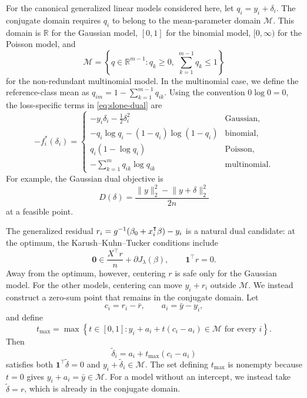 \documentclass[a4paper,fleqn]{cas-sc}
\begin{document}
For the canonical generalized linear models considered here, let
\(q_i = y_i + \delta_i\). The conjugate domain requires \(q_i\) to belong to the
mean-parameter domain \(\mathcal{M}\). This domain is \(\mathbb{R}\) for the
Gaussian model, \([0,1]\) for the binomial model, \([0,\infty)\) for the Poisson
model, and
\[
  \mathcal{M} = \left\{ q \in \mathbb{R}^{m-1}: q_k \geq 0,\; \sum_{k=1}^{m-1}q_k \leq 1 \right\}
\]
for the non-redundant multinomial model. In the multinomial case, we define the
reference-class mean as \(q_{im} = 1 - \sum_{k=1}^{m-1}q_{ik}\). Using the
convention \(0\log 0 = 0\), the loss-specific terms in \autoref{eq:slope-dual}
are
\[
  -f_i^*(\delta_i)
  = \begin{cases}
      -y_i\delta_i - \frac{1}{2}\delta_i^2         & \text{Gaussian},    \\
      -q_i\log q_i - (1 - q_i)\log(1 - q_i)        & \text{binomial},    \\
      q_i(1 - \log q_i)                            & \text{Poisson},     \\
      -\displaystyle\sum_{k=1}^m q_{ik}\log q_{ik} & \text{multinomial}.
    \end{cases}
\]
For example, the Gaussian dual objective is
\[
  D(\delta) = \frac{\lVert y\rVert_2^2 - \lVert y + \delta\rVert_2^2}{2n}
\]
at a feasible point.

The generalized residual \(r_i = g^{-1}(\beta_0 + x_i^\intercal\beta) - y_i\) is
a natural dual candidate: at the optimum, the Karush--Kuhn--Tucker conditions
include
\[
  \bm{0} \in \frac{X^\intercal r}{n}
             + \partial J_\lambda(\beta), \qquad \bm{1}^\intercal r
         =   0.
\]
Away from the optimum, however, centering \(r\) is safe only for the Gaussian
model. For the other models, centering can move \(y_i + r_i\) outside
\(\mathcal{M}\). We instead construct a zero-sum point that remains in the
conjugate domain. Let
\[
  c_i = r_i - \bar r, \qquad a_i = \bar y - y_i,
\]
and define
\[
  t_{\max} = \max\left\{ t \in[0,1] : y_i + a_i + t(c_i - a_i) \in \mathcal{M} \text{ for every }i \right\}.
\]
Then
\[
  \widetilde\delta_i = a_i + t_{\max}(c_i - a_i)
\]
satisfies both \(\bm{1}^\intercal\widetilde\delta = 0\) and
\(y_i + \widetilde\delta_i \in \mathcal{M}\). The set defining \(t_{\max}\) is
nonempty because \(t = 0\) gives \(y_i + a_i = \bar y \in \mathcal{M}\). For a
model without an intercept, we instead take \(\widetilde\delta = r\), which is
already in the conjugate domain.
\end{document}
